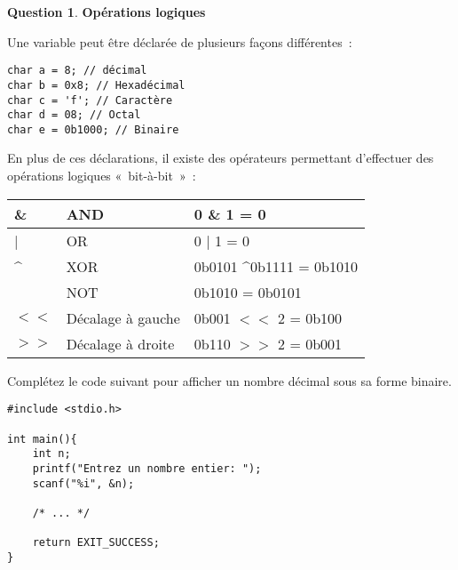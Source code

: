 \documentclass[11pt,a4paper,dvipsnames]{article}
\theoremstyle{definition}%
\newtheorem{Q}{Question}[] %
\begin{document}
\begin{Q} \textbf{Opérations logiques}

Une variable peut être déclarée de plusieurs façons différentes~:
\begin{verbatim}
char a = 8; // décimal
char b = 0x8; // Hexadécimal
char c = 'f'; // Caractère
char d = 08; // Octal
char e = 0b1000; // Binaire
\end{verbatim}

En plus de ces déclarations, il existe des opérateurs permettant d'effectuer des opérations logiques «~bit-à-bit~»~:
\begin{center}
	\begin{tabular}{|l|l|l|} \hline
	\& & AND & 0 \& 1 = 0\\ \hline
	| & OR & 0 | 1 = 0\\ \hline
	\textasciicircum & XOR & 0b0101 \textasciicircum 0b1111 = 0b1010\\ \hline
	\texttildelow & NOT & \texttildelow 0b1010 = 0b0101\\ \hline
	$<<$ & Décalage à gauche & 0b001 $<<$ 2 = 0b100 \\ \hline
	$>>$ & Décalage à droite & 0b110 $>>$ 2 = 0b001 \\ \hline
	\end{tabular}
\end{center}


Complétez le code suivant pour afficher un nombre décimal sous sa forme binaire.
\begin{verbatim}
#include <stdio.h>

int main(){
	int n;
	printf("Entrez un nombre entier: ");
	scanf("%i", &n);

	/* ... */

	return EXIT_SUCCESS;
}
\end{verbatim}
\end{Q}
\end{document}
